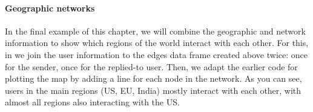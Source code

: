 \paragraph{Geographic networks}
In the final example of this chapter, we will combine the geographic and network information to
show which regions of the world interact with each other.
For this, in  we join the user information to the edges data frame created above twice:
once for the sender, once for the replied-to user.
Then, we adapt the earlier code for plotting the map by adding a line for each node in the network.
As you can see, users in the main regions (US, EU, India) mostly interact with each other,
with almost all regions also interacting with the US.

